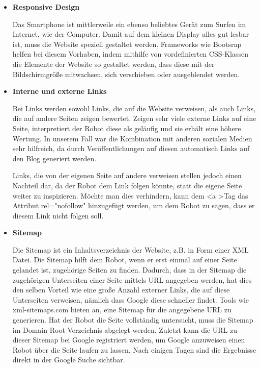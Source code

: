 {\begin{itemize}
      \item \textbf{Responsive Design}

        Das Smartphone ist mittlerweile ein ebenso beliebtes Gerät zum Surfen im Internet, wie der Computer. Damit auf dem kleinen Display alles gut lesbar ist, muss die Website speziell
        gestaltet werden. Frameworks wie Bootsrap helfen bei diesem Vorhaben, indem mithilfe von vordefinierten CSS-Klassen die Elemente der Website so gestaltet werden, dass diese mit der
        Bildschirmgröße mitwachsen, sich verschieben oder ausgeblendet werden.

      \item \textbf{Interne und externe Links}

        Bei Links werden sowohl Links, die auf die Website verweisen, als auch Links, die auf andere Seiten zeigen bewertet.
        Zeigen sehr viele externe Links auf eine Seite, interpretiert der Robot diese als geläufig und sie erhält eine höhere Wertung. In unserem Fall war die Kombination mit anderen sozialen
        Medien sehr hilfreich, da durch Veröffentlichungen auf diesen automatisch Links auf den Blog generiert werden.

        Links, die von der eigenen Seite auf andere verweisen stellen jedoch einen Nachteil dar, da der Robot dem Link folgen könnte, statt die eigene Seite weiter zu inspizieren. Möchte man dies
        verhindern, kann dem \textless a \textgreater Tag das Attribut rel="nofollow" hinzugefügt werden, um dem Robot zu sagen, dass er diesem Link nicht folgen soll.

      \item \textbf{Sitemap}

      	Die Sitemap ist ein Inhaltsverzeichnis der Website, z.B. in Form einer XML Datei. Die Sitemap hilft dem Robot, wenn er erst einmal auf einer Seite gelandet ist, zugehörige Seiten
        zu finden. Dadurch, dass in der Sitemap die zugehörigen Unterseiten einer Seite mittels URL angegeben werden, hat dies den selben Vorteil wie eine große Anzahl externer Links, die auf diese
        Unterseiten verweisen, nämlich dass Google diese schneller findet. Tools wie xml-sitemaps.com bieten an, eine Sitemap für die angegebene URL zu generieren. Hat der Robot die Seite vollständig
        untersucht, muss die Sitemap im Domain Root-Verzeichnis abgelegt werden. Zuletzt kann die URL zu dieser Sitemap bei Google registriert werden, um Google anzuweisen einen Robot über die Seite
        laufen zu lassen. Nach einigen Tagen sind die Ergebnisse direkt in der Google Suche sichtbar.


\end{itemize}}
